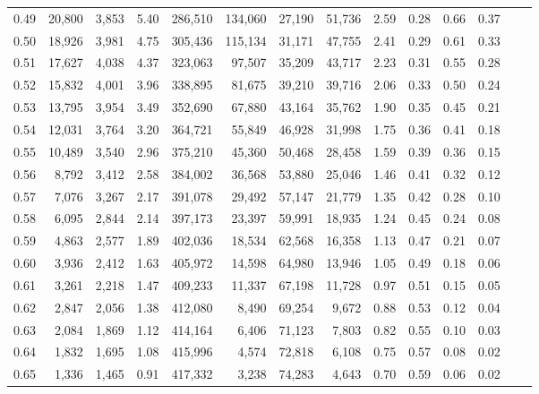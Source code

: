 \begin{tabular}{rrrrrrrrrrrrrr}
0.49 &  20,800 &  3,853 &    5.40 &  286,510 &  134,060 &  27,190 &  51,736 &  2.59 &  0.28 &  0.66 &      0.37 \\
0.50 &  18,926 &  3,981 &    4.75 &  305,436 &  115,134 &  31,171 &  47,755 &  2.41 &  0.29 &  0.61 &      0.33 \\
0.51 &  17,627 &  4,038 &    4.37 &  323,063 &   97,507 &  35,209 &  43,717 &  2.23 &  0.31 &  0.55 &      0.28 \\
0.52 &  15,832 &  4,001 &    3.96 &  338,895 &   81,675 &  39,210 &  39,716 &  2.06 &  0.33 &  0.50 &      0.24 \\
0.53 &  13,795 &  3,954 &    3.49 &  352,690 &   67,880 &  43,164 &  35,762 &  1.90 &  0.35 &  0.45 &      0.21 \\
0.54 &  12,031 &  3,764 &    3.20 &  364,721 &   55,849 &  46,928 &  31,998 &  1.75 &  0.36 &  0.41 &      0.18 \\
0.55 &  10,489 &  3,540 &    2.96 &  375,210 &   45,360 &  50,468 &  28,458 &  1.59 &  0.39 &  0.36 &      0.15 \\
0.56 &   8,792 &  3,412 &    2.58 &  384,002 &   36,568 &  53,880 &  25,046 &  1.46 &  0.41 &  0.32 &      0.12 \\
0.57 &   7,076 &  3,267 &    2.17 &  391,078 &   29,492 &  57,147 &  21,779 &  1.35 &  0.42 &  0.28 &      0.10 \\
0.58 &   6,095 &  2,844 &    2.14 &  397,173 &   23,397 &  59,991 &  18,935 &  1.24 &  0.45 &  0.24 &      0.08 \\
0.59 &   4,863 &  2,577 &    1.89 &  402,036 &   18,534 &  62,568 &  16,358 &  1.13 &  0.47 &  0.21 &      0.07 \\
0.60 &   3,936 &  2,412 &    1.63 &  405,972 &   14,598 &  64,980 &  13,946 &  1.05 &  0.49 &  0.18 &      0.06 \\
0.61 &   3,261 &  2,218 &    1.47 &  409,233 &   11,337 &  67,198 &  11,728 &  0.97 &  0.51 &  0.15 &      0.05 \\
0.62 &   2,847 &  2,056 &    1.38 &  412,080 &    8,490 &  69,254 &   9,672 &  0.88 &  0.53 &  0.12 &      0.04 \\
0.63 &   2,084 &  1,869 &    1.12 &  414,164 &    6,406 &  71,123 &   7,803 &  0.82 &  0.55 &  0.10 &      0.03 \\
0.64 &   1,832 &  1,695 &    1.08 &  415,996 &    4,574 &  72,818 &   6,108 &  0.75 &  0.57 &  0.08 &      0.02 \\
0.65 &   1,336 &  1,465 &    0.91 &  417,332 &    3,238 &  74,283 &   4,643 &  0.70 &  0.59 &  0.06 &      0.02 \\

\end{tabular}
